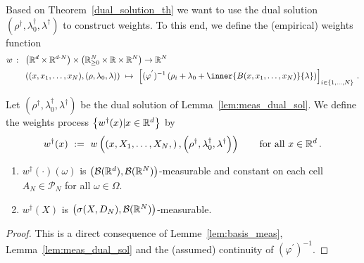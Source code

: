 Based on Theorem~\ref{dual_solution_th}
we want to use the dual 
solution 
$
\left( \rho^\dagger,\lambda_0^\dagger,\lambda^\dagger \right)
$
to construct weights.
To this end, we define the (empirical) weights function
\begin{align*}
 w\ \colon\
 &
 \left( 
  \R^d\times \R^{d\cdot N}
 \right)
  \times
  \left( 
\R^N_{\ge 0}\times \R\times \R^N
  \right)
  \to
  \R^N
  \\
 &
  \left( 
  (x,x_1,\ldots,x_N),(\rho,\lambda_0,\lambda)
  \right)
  \ 
  \mapsto
  \ 
  \left[ 
  (\varphi^{'})^{-1}
  \left( 
    \rho_i
    +
    \lambda_0
    +
    \inner
    {B(x,x_1,\ldots,x_N)}
    {\lambda}
  \right)
\right]_{i\in \left\{ 1,\ldots,N \right\}}
\,.
\end{align*}
\begin{definition}
  Let 
  $
\left( \rho^\dagger,\lambda_0^\dagger,\lambda^\dagger \right)
  $
  be the dual solution of Lemma~\ref{lem:meas_dual_sol}.
  We define the weights process 
  $\left\{ w^\dagger(x) | x\in\mathbb{R}^d\right\}$
  by
  \begin{align*}
    w^\dagger(x) 
    \ 
    :=
    \ 
    w
    \left( 
    \left( 
    x,X_1,\ldots,X_N,
    \right)
    ,
\left( \rho^\dagger,\lambda_0^\dagger,\lambda^\dagger \right)
    \right)
    \qquad
    \text{for all}\ 
    x\in\R^d
    \,.
  \end{align*}
\end{definition}
\begin{lemma}
  \quad
  \begin{enumerate}[label=(\roman*)]
\item
  $w^\dagger(\cdot)(\omega)$ is 
  $\left(
    \mathcal{B}(\mathbb{R}^d),\mathcal{B}(\mathbb{R}^N)
  \right)$-measurable
  and
  constant on each cell 
  $A_N\in\mathcal{P}_N$
  for all $\omega\in\Omega$. 
\item
  $w^\dagger(X)$ is $\left(
    \sigma(X,D_N),\mathcal{B}(\mathbb{R}^N)
  \right)$-measurable. 
  \end{enumerate}
\end{lemma}
\begin{proof}
  This is a direct consequence of Lemme~\ref{lem:basis_meas}, Lemma~\ref{lem:meas_dual_sol}
  and 
  the (assumed) continuity of $(\varphi^{'})^{-1}$.
\end{proof}


